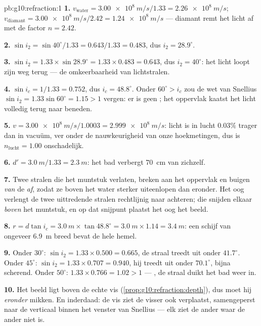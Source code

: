 \begin{solution}{pb:g10:refraction:1}
\textbf{1.} $v_{\text{water}} = \qty{3.00e8}{m/s}/1.33 =
\qty{2.26e8}{m/s}$; $v_{\text{diamant}} = \qty{3.00e8}{m/s}/2.42 =
\qty{1.24e8}{m/s}$ --- diamant remt het licht af met de factor
$n = 2.42$.

\textbf{2.} $\sin i_2 = \sin 40^\circ / 1.33 = 0.643/1.33 = 0.483$, dus
$i_2 = 28.9^\circ$.

\textbf{3.} $\sin i_2 = 1.33 \times \sin 28.9^\circ = 1.33 \times
0.483 = 0.643$, dus $i_2 = 40^\circ$: het licht loopt zijn weg terug ---
de omkeerbaarheid van lichtstralen.

\textbf{4.} $\sin i_c = 1/1.33 = 0.752$, dus $i_c = 48.8^\circ$. Onder
$60^\circ > i_c$ zou de wet van Snellius $\sin i_2 = 1.33 \sin 60^\circ
= 1.15 > 1$ vergen: er is geen ; het oppervlak kaatst het
licht volledig terug naar beneden.

\textbf{5.} $v = \qty{3.00e8}{m/s}/1.0003 = \qty{2.999e8}{m/s}$: licht
is in lucht $0.03\%$ trager dan in vacuüm, ver onder de nauwkeurigheid
van onze hoekmetingen, dus is $n_{\text{lucht}} = 1.00$ onschadelijk.

\textbf{6.} $d' = \qty{3.0}{m}/1.33 = \qty{2.3}{m}$: het bad verbergt
\qty{70}{cm} van zichzelf.

\textbf{7.} Twee stralen die het muntstuk verlaten, breken aan het
oppervlak en buigen \emph{van} de  \emph{af}, zodat ze boven het
water sterker uiteenlopen dan eronder. Het oog verlengt de twee
uittredende stralen rechtlijnig naar achteren; die snijden elkaar
\emph{boven} het muntstuk, en op dat snijpunt plaatst het oog het beeld.

\textbf{8.} $r = d \tan i_c = \qty{3.0}{m} \times \tan 48.8^\circ =
\qty{3.0}{m} \times 1.14 = \qty{3.4}{m}$: een schijf van ongeveer
\qty{6.9}{m} breed bevat de hele hemel.

\textbf{9.} Onder $30^\circ$: $\sin i_2 = 1.33 \times 0.500 = 0.665$, de
straal treedt uit onder $41.7^\circ$. Onder $45^\circ$: $\sin i_2 =
1.33 \times 0.707 = 0.940$, hij treedt uit onder $70.1^\circ$, bijna
scherend. Onder $50^\circ$: $1.33 \times 0.766 = 1.02 > 1$ --- , de straal duikt het bad weer in.

\textbf{10.} Het beeld ligt boven de echte vis
(\cref{prop:g10:refraction:depth}), dus moet hij \emph{eronder} mikken.
En inderdaad: de vis ziet de visser ook verplaatst, samengeperst naar de
verticaal binnen het venster van Snellius --- elk ziet de ander waar de
ander niet is.


\end{solution}
